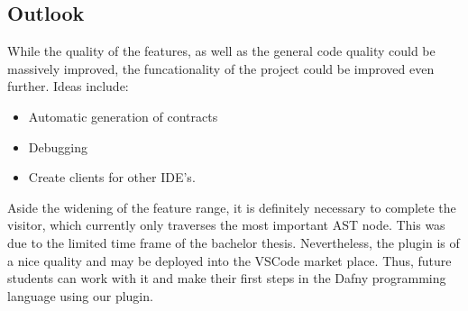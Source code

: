 \subsection{Outlook}
While the quality of the features, as well as the general code quality could be massively improved, the funcationality of the project could be improved even further. Ideas include:
\begin{itemize}
    \item Automatic generation of contracts
    \item Debugging
    \item Create clients for other IDE's.
\end{itemize}
Aside the widening of the feature range, it is definitely necessary to complete the visitor, which currently only traverses the most important AST node. This was due to the limited time frame of the bachelor thesis. Nevertheless, the plugin is of a nice quality and may be deployed into the VSCode market place. Thus, future students can work with it and make their first steps in the Dafny programming language using our plugin.








